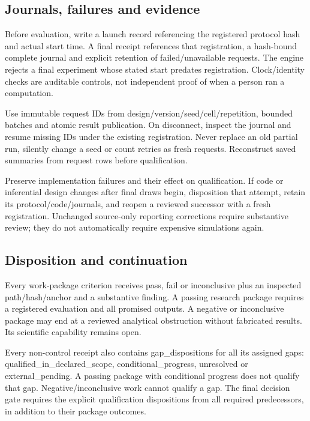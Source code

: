 \documentclass[
  11pt,
  a4paper,
]{article}
\begin{document}
\hypertarget{journals-failures-and-evidence}{%
\subsection{Journals, failures and
evidence}\label{journals-failures-and-evidence}}

Before evaluation, write a launch record referencing the registered
protocol hash and actual start time. A final receipt references that
registration, a hash-bound complete journal and explicit retention of
failed/unavailable requests. The engine rejects a final experiment whose
stated start predates registration. Clock/identity checks are auditable
controls, not independent proof of when a person ran a computation.

Use immutable request IDs from design/version/seed/cell/repetition,
bounded batches and atomic result publication. On disconnect, inspect
the journal and resume missing IDs under the existing registration.
Never replace an old partial run, silently change a seed or count
retries as fresh requests. Reconstruct saved summaries from request rows
before qualification.

Preserve implementation failures and their effect on qualification. If
code or inferential design changes after final draws begin, disposition
that attempt, retain its protocol/code/journals, and reopen a reviewed
successor with a fresh registration. Unchanged source-only reporting
corrections require substantive review; they do not automatically
require expensive simulations again.

\hypertarget{disposition-and-continuation}{%
\subsection{Disposition and
continuation}\label{disposition-and-continuation}}

Every work-package criterion receives pass, fail or inconclusive plus an
inspected path/hash/anchor and a substantive finding. A passing research
package requires a registered evaluation and all promised outputs. A
negative or inconclusive package may end at a reviewed analytical
obstruction without fabricated results. Its scientific capability
remains open.

Every non-control receipt also contains gap\_dispositions for all its
assigned gaps: qualified\_in\_declared\_scope, conditional\_progress,
unresolved or external\_pending. A passing package with conditional
progress does not qualify that gap. Negative/inconclusive work cannot
qualify a gap. The final decision gate requires the explicit
qualification dispositions from all required predecessors, in addition
to their package outcomes.
\end{document}
